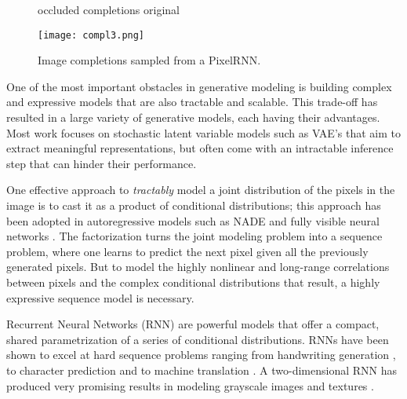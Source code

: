 \documentclass{article}
\begin{document}
\begin{figure}[!t]
\centering
\small
\hspace{0.02cm} {occluded} \hfill completions \hfill{original} \,

\vspace{0.1cm}
\texttt{[image: compl3.png]} \vspace{-0.3cm}
\caption{Image completions sampled from a PixelRNN.}
\label{fig:intro_completions}
\vspace{-0.5cm}
\end{figure}

One of the most important obstacles in generative modeling is building complex and expressive models that are also tractable and scalable. This trade-off has resulted in a large variety of generative models, each having their advantages. Most work focuses on stochastic latent variable models such as VAE's \cite{rezende2014stochastic, DBLP:journals/corr/KingmaW13} that aim to extract meaningful representations, but often come with an intractable inference step that can hinder their performance.

One effective approach to \emph{tractably} model a joint distribution of the pixels in the image is to cast it as a product of conditional distributions; this approach has been adopted in autoregressive models such as NADE \cite{larochelle2011} and fully visible neural networks \cite{neal1992connectionist, Bengio_Bengio_NIPS99}. The factorization turns the joint modeling problem into a sequence problem, where one learns to predict the next pixel given all the previously generated pixels. But to model the highly nonlinear and long-range correlations between pixels and the complex conditional distributions that result, a highly expressive sequence model is necessary.

Recurrent Neural Networks (RNN) are powerful models that offer a compact, shared parametrization of a series of conditional distributions. RNNs have been shown to excel at hard sequence problems ranging from handwriting generation \cite{DBLP:journals/corr/Graves13}, to character prediction \cite{sutskever2011generating} and to machine translation \cite{kalchbrenner13emnlp}. A two-dimensional RNN has produced very promising results in modeling grayscale images and textures \cite{theis2015generative}. 
\end{document}
